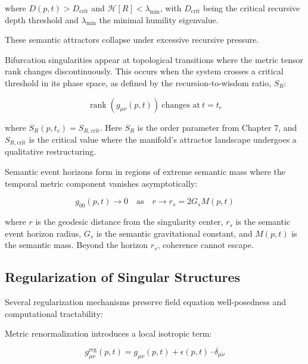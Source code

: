 where \(D(p, t) > D_{\text{crit}}\) and \(\mathcal{H}[R] < \lambda_{\text{min}}\), with \(D_{\text{crit}}\) being the critical recursive depth threshold and \(\lambda_{\text{min}}\) the minimal humility eigenvalue.

These semantic attractors collapse under excessive recursive pressure.

Bifurcation singularities appear at topological transitions where the metric tensor rank changes discontinuously. This occurs when the system crosses a critical threshold in its phase space, as defined by the recursion-to-wisdom ratio, \(S_R\):

\begin{equation}
\operatorname{rank}(g_{\mu\nu}(p, t)) \ \text{changes at} \ t = t_c
\end{equation}

where \(S_R(p, t_c) = S_{R, \text{crit}}\). Here \(S_R\) is the order parameter from Chapter 7, and \(S_{R, \text{crit}}\) is the critical value where the manifold's attractor landscape undergoes a qualitative restructuring.

Semantic event horizons form in regions of extreme semantic mass where the temporal metric component vanishes asymptotically:

\begin{equation}
g_{00}(p, t) \to 0 \quad \text{as} \quad r \to r_s = 2G_s M(p, t)
\end{equation}

where \(r\) is the geodesic distance from the singularity center, \(r_s\) is the semantic event horizon radius, \(G_s\) is the semantic gravitational constant, and \(M(p, t)\) is the semantic mass. Beyond the horizon \(r_s\), coherence cannot escape.


\subsection{Regularization of Singular Structures}
\label{12.2.1:regularization_of_singular_structures}

Several regularization mechanisms preserve field equation well-posedness and computational tractability:

Metric renormalization introduces a local isotropic term:

\begin{equation}
g_{\mu\nu}^{\text{reg}}(p, t) = g_{\mu\nu}(p, t) + \epsilon(p, t) \cdot \delta_{\mu\nu}
\end{equation}

